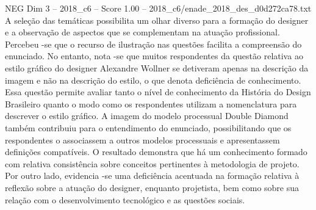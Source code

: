 \begin{textsample}{NEG Dim 3 – 2018\_c6 – Score 1.00 – 2018\_c6/enade\_2018\_des\_d0d272ca78.txt}
A seleção das temáticas possibilita um olhar diverso para a formação do designer e a observação de aspectos que se complementam na atuação profissional.
Percebeu -se que o recurso de ilustração nas questões facilita a compreensão do enunciado.
No entanto, nota -se que muitos respondentes da questão relativa ao estilo gráfico do designer Alexandre Wollner se detiveram apenas na descrição da imagem e não na descrição do estilo, o que denota deficiência de conhecimento.
Essa questão permite avaliar tanto o nível de conhecimento da História do Design Brasileiro quanto o modo como os respondentes utilizam a nomenclatura para descrever o estilo gráfico.
A imagem do modelo processual Double Diamond também contribuiu para o entendimento do enunciado, possibilitando que os respondentes o associassem a outros modelos processuais e apresentassem definições compatíveis.
O resultado demonstra que há um conhecimento formado com relativa consistência sobre conceitos pertinentes à metodologia de projeto.
Por outro lado, evidencia -se uma deficiência acentuada na formação relativa à reflexão sobre a atuação do designer, enquanto projetista, bem como sobre sua relação com o desenvolvimento tecnológico e as questões sociais.

\end{textsample}
